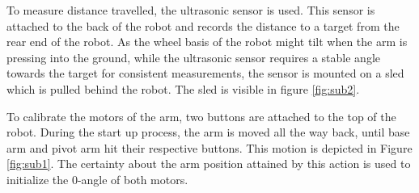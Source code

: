 \documentclass[11pt, a4paper]{article}
\begin{document}
To measure distance travelled, the ultrasonic sensor is used. This sensor is attached to the back of the robot and records the distance to a target from the rear end of the robot. As the wheel basis of the robot might tilt when the arm is pressing into the ground, while the ultrasonic sensor requires a stable angle towards the target for consistent measurements, the sensor is mounted on a sled which is pulled behind the robot. The sled is visible in figure \ref{fig:sub2}.

To calibrate the motors of the arm, two buttons are attached to the top of the robot. During the start up process, the arm is moved all the way back, until base arm and pivot arm hit their respective buttons. This motion is depicted in Figure \ref{fig:sub1}. The certainty about the arm position attained by this action is used to initialize the 0-angle of both motors.
\end{document}
